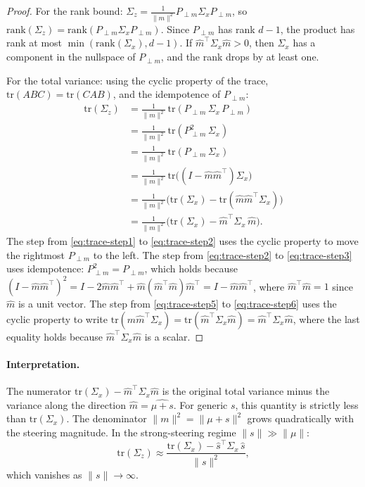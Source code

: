 \begin{proof}
For the rank bound: $\Sigma_z = \frac{1}{\|m\|^2} P_{\perp m}\Sigma_x P_{\perp m}$, so $\mathrm{rank}(\Sigma_z) = \mathrm{rank}(P_{\perp m}\Sigma_x P_{\perp m})$.
Since $P_{\perp m}$ has rank $d-1$, the product has rank at most $\min(\mathrm{rank}(\Sigma_x), d-1)$.
If $\hat{m}^\top \Sigma_x \hat{m} > 0$, then $\Sigma_x$ has a component in the nullspace of $P_{\perp m}$, and the rank drops by at least one.

For the total variance: using the cyclic property of the trace, $\mathrm{tr}(ABC) = \mathrm{tr}(CAB)$, and the idempotence of $P_{\perp m}$:
%
\begin{align}
  \mathrm{tr}(\Sigma_z)
  &= \frac{1}{\|m\|^2}\,\mathrm{tr}(P_{\perp m}\,\Sigma_x\,P_{\perp m})
  \label{eq:trace-step1}\\
  &= \frac{1}{\|m\|^2}\,\mathrm{tr}(P_{\perp m}^2\,\Sigma_x)
  \label{eq:trace-step2}\\
  &= \frac{1}{\|m\|^2}\,\mathrm{tr}(P_{\perp m}\,\Sigma_x)
  \label{eq:trace-step3}\\
  &= \frac{1}{\|m\|^2}\,\mathrm{tr}\!\big((I - \hat{m}\hat{m}^\top)\Sigma_x\big)
  \label{eq:trace-step4}\\
  &= \frac{1}{\|m\|^2}\big(\mathrm{tr}(\Sigma_x) - \mathrm{tr}(\hat{m}\hat{m}^\top\Sigma_x)\big)
  \label{eq:trace-step5}\\
  &= \frac{1}{\|m\|^2}\big(\mathrm{tr}(\Sigma_x) - \hat{m}^\top\Sigma_x\,\hat{m}\big).
  \label{eq:trace-step6}
\end{align}
%
The step from \eqref{eq:trace-step1} to \eqref{eq:trace-step2} uses the cyclic property to move the rightmost $P_{\perp m}$ to the left.
The step from \eqref{eq:trace-step2} to \eqref{eq:trace-step3} uses idempotence: $P_{\perp m}^2 = P_{\perp m}$, which holds because
$(I - \hat{m}\hat{m}^\top)^2 = I - 2\hat{m}\hat{m}^\top + \hat{m}(\hat{m}^\top\hat{m})\hat{m}^\top = I - \hat{m}\hat{m}^\top$,
where $\hat{m}^\top\hat{m} = 1$ since $\hat{m}$ is a unit vector.
The step from \eqref{eq:trace-step5} to \eqref{eq:trace-step6} uses the cyclic property to write $\mathrm{tr}(\hat{m}\hat{m}^\top\Sigma_x) = \mathrm{tr}(\hat{m}^\top\Sigma_x\hat{m}) = \hat{m}^\top\Sigma_x\hat{m}$, where the last equality holds because $\hat{m}^\top\Sigma_x\hat{m}$ is a scalar.
\end{proof}

\paragraph{Interpretation.}
The numerator $\mathrm{tr}(\Sigma_x) - \hat{m}^\top\Sigma_x\hat{m}$ is the original total variance minus the variance along the direction $\hat{m} = \widehat{\mu + s}$.
For generic $s$, this quantity is strictly less than $\mathrm{tr}(\Sigma_x)$.
The denominator $\|m\|^2 = \|\mu + s\|^2$ grows quadratically with the steering magnitude.
In the strong-steering regime $\|s\| \gg \|\mu\|$:
%
\begin{equation}
  \mathrm{tr}(\Sigma_z) \approx \frac{\mathrm{tr}(\Sigma_x) - \hat{s}^\top\Sigma_x\,\hat{s}}{\|s\|^2},
\end{equation}
%
which vanishes as $\|s\| \to \infty$.

